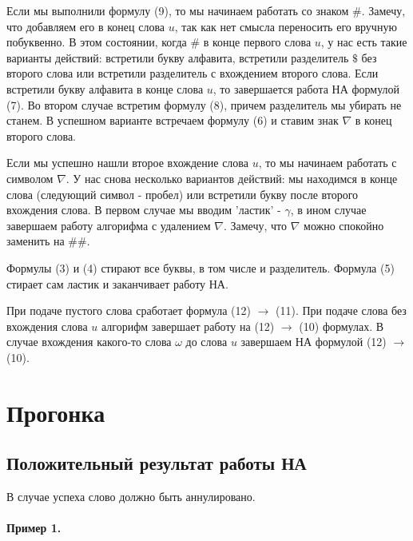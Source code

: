  \medskip

 Если мы выполнили формулу (9), то мы начинаем работать со знаком $\#$.
 Замечу, что добавляем его в конец слова $u$, так как нет смысла переносить его вручную побуквенно.
 В этом состоянии, когда $\#$ в конце первого слова  $u$, у нас есть такие варианты действий:
 встретили букву алфавита, встретили разделитель  $\$$ без второго слова или встретили
 разделитель с вхождением второго слова. Если встретили букву алфавита в конце слова  $u$, то
 завершается работа НА формулой (7). Во втором случае встретим формулу (8), причем разделитель
 мы убирать не станем. В успешном варианте встречаем формулу (6) и ставим знак  $\nabla $ в конец
 второго слова.

 \medskip

 Если мы успешно нашли второе вхождение слова $u$, то мы начинаем работать с символом
  $\nabla $. У нас снова несколько вариантов действий: мы находимся в конце слова (следующий
  символ - пробел) или встретили букву после второго вхождения слова. В первом случае
  мы вводим 'ластик' - $\gamma$, в ином случае завершаем работу алгорифма с удалением
  $\nabla $. Замечу, что $\nabla$ можно спокойно заменить на $\#\#$.

  Формулы (3) и (4) стирают все буквы, в том числе и разделитель. Формула (5) стирает
  сам ластик и заканчивает работу НА.

  \medskip

  При подаче пустого слова сработает формула (12) $\to$ (11). При подаче слова без вхождения
  слова $u$ алгорифм завершает работу на \newline (12) $\to$ (10) формулах. В случае
  вхождения какого-то слова $\omega$ до слова  $u$ завершаем НА формулой (12) $\to $ (10).

  \section{Прогонка}

\subsection{Положительный результат работы НА}

В случае успеха слово должно быть аннулировано.

\paragraph*{Пример 1.} ${}$\newline

